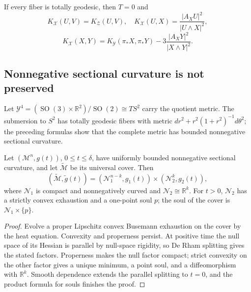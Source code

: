 \begin{remark}
\label{rem:chow-ii-oneill-totally-geodesic-fibers}


If every fiber is totally geodesic, then \(T=0\) and
\[
 K_{\mathcal X}(U,V)=K_{\mathcal Z}(U,V),\quad
 K_{\mathcal X}(U,X)=\frac{|A_XU|^2}{|U\wedge X|^2},
\]
\[
 K_{\mathcal X}(X,Y)=K_{\mathcal Y}(\pi_*X,\pi_*Y)
 -3\frac{|A_XY|^2}{|X\wedge Y|^2}.
\]
\end{remark}

\subsection{Nonnegative sectional curvature is not preserved}

Let
\(\mathcal Y^4=(\operatorname{SO}(3)\times\mathbb R^2)/\operatorname{SO}(2)
\cong TS^2\) carry the quotient metric.  The submersion to \(S^2\) has
totally geodesic fibers with metric
\(dr^2+r^2(1+r^2)^{-1}d\theta^2\); the preceding formulas show that the
complete metric has bounded nonnegative sectional curvature.

\begin{theorem}
\label{thm:chow-ii-persistent-nonnegative-sectional-splitting}

Let \((\mathcal M^n,g(t))\), \(0\leq t\leq\delta\), have uniformly bounded
nonnegative sectional curvature, and let \(\widetilde{\mathcal M}\) be its
universal cover.  Then
\[
 (\widetilde{\mathcal M},\widetilde g(t))
 =(\mathcal N_1^{n-k},g_1(t))\times(\mathcal N_2^k,g_2(t)),
\]
where \(\mathcal N_1\) is compact and nonnegatively curved and
\(\mathcal N_2\cong\mathbb R^k\).  For \(t>0\), \(\mathcal N_2\) has a
strictly convex exhaustion and a one-point soul \(p\); the soul of the cover
is \(\mathcal N_1\times\{p\}\).
\end{theorem}
\begin{proof}
\sketch
{}
Evolve a proper Lipschitz convex Busemann exhaustion on the cover by the heat
equation.  Convexity and properness persist.  At positive time the null space
of its Hessian is parallel by null-space rigidity, so De Rham splitting gives
the stated factors.  Properness makes the null factor compact; strict
convexity on the other factor gives a unique minimum, a point soul, and a
diffeomorphism with \(\mathbb R^k\).  Smooth dependence extends the parallel
splitting to \(t=0\), and the product formula for souls finishes the proof.
\end{proof}

